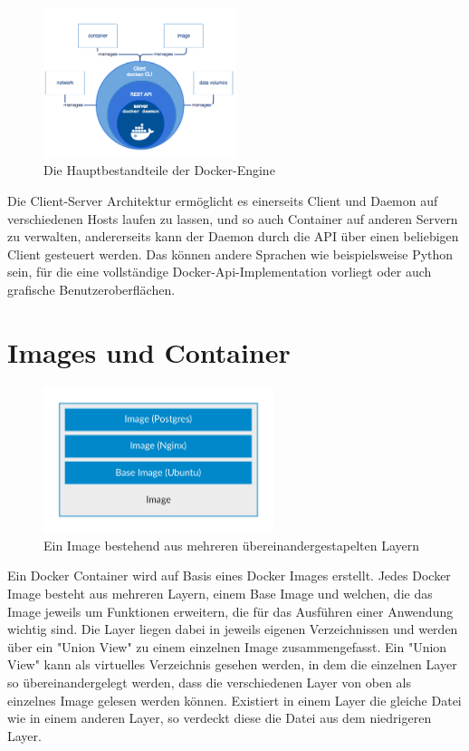 \begin{figure}[!ht]
  \centering
  \includegraphics[width=0.5\textwidth]{images/8-docker-engine.png}
  \caption{Die Hauptbestandteile der Docker-Engine \cite{docker:ud}}
\end{figure}

\noindent Die Client-Server Architektur ermöglicht es einerseits Client und Daemon auf verschiedenen Hosts laufen zu lassen, und so auch Container auf anderen Servern zu verwalten, andererseits kann der Daemon durch die API über einen beliebigen Client gesteuert werden. Das können andere Sprachen wie beispielsweise Python sein, für die eine vollständige Docker-Api-Implementation vorliegt oder auch grafische Benutzeroberflächen.


\section{Images und Container}

\begin{figure}[!ht]
  \centering
  \includegraphics[width=0.6\textwidth]{images/9-docker-image.png}
  \caption{Ein Image bestehend aus mehreren übereinandergestapelten Layern \cite{7158965}}
\end{figure}

\noindent Ein Docker Container wird auf Basis eines Docker Images erstellt. Jedes Docker Image besteht aus mehreren Layern, einem Base Image und welchen, die das Image jeweils um Funktionen erweitern, die für das Ausführen einer Anwendung wichtig sind. Die Layer liegen dabei in jeweils eigenen Verzeichnissen und werden über ein "{}Union View"{} zu einem einzelnen Image zusammengefasst. Ein "{}Union View"{} kann als virtuelles Verzeichnis gesehen werden, in dem die einzelnen Layer so übereinandergelegt werden, dass die verschiedenen Layer von oben als einzelnes Image gelesen werden können. Existiert in einem Layer die gleiche Datei wie in einem anderen Layer, so verdeckt diese die Datei aus dem niedrigeren Layer.\\


